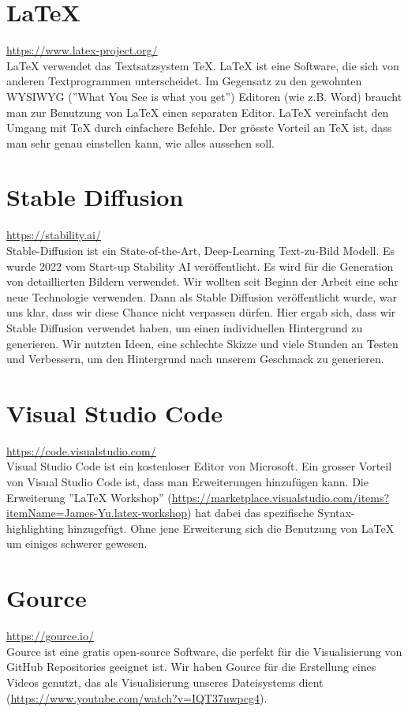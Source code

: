 \section{LaTeX}
\url{https://www.latex-project.org/}\\
LaTeX verwendet das Textsatzsystem TeX. LaTeX ist eine Software, die sich von anderen Textprogrammen unterscheidet. Im Gegensatz zu den gewohnten WYSIWYG (''What You See is what you get'') Editoren (wie z.B. Word)
braucht man zur Benutzung von LaTeX einen separaten Editor. LaTeX vereinfacht den Umgang mit TeX durch einfachere Befehle. Der grösste Vorteil an TeX ist, dass man sehr genau einstellen kann, wie alles aussehen soll.


\section{Stable Diffusion}
\url{https://stability.ai/}\\
Stable-Diffusion ist ein State-of-the-Art, Deep-Learning Text-zu-Bild Modell. Es wurde 2022 vom Start-up Stability AI veröffentlicht. Es wird für die Generation von detaillierten Bildern verwendet. Wir wollten seit
Beginn der Arbeit eine sehr neue Technologie verwenden. Dann als Stable Diffusion veröffentlicht wurde, war uns klar, dass wir diese Chance nicht verpassen dürfen. Hier ergab sich, dass wir Stable Diffusion verwendet haben, um einen individuellen
Hintergrund zu generieren. Wir nutzten Ideen, eine schlechte Skizze und viele Stunden an Testen und Verbessern, um den Hintergrund nach unserem Geschmack zu generieren.

\section{Visual Studio Code}
\url{https://code.visualstudio.com/}\\
Visual Studio Code ist ein kostenloser Editor von Microsoft. Ein grosser Vorteil von Visual Studio Code ist, dass man Erweiterungen hinzufügen kann. Die Erweiterung ''LaTeX Workshop'' (\url{https://marketplace.visualstudio.com/items?itemName=James-Yu.latex-workshop})
hat dabei das spezifische Syntax-highlighting hinzugefügt. Ohne jene Erweiterung sich die Benutzung von LaTeX um einiges schwerer gewesen.

\section{Gource}
\url{https://gource.io/}\\
Gource ist eine gratis open-source Software, die perfekt für die Visualisierung von GitHub Repositories geeignet ist. Wir haben Gource für die Erstellung eines Videos genutzt, das als Visualisierung unseres Dateisystems
dient (\url{https://www.youtube.com/watch?v=IQT37uwpcg4}).

